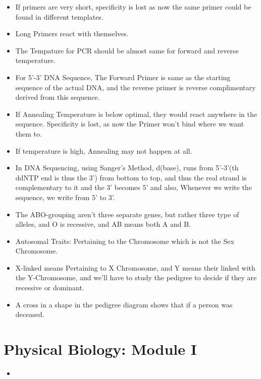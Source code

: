 \documentclass{article}
\begin{document}
\begin{itemize}
  \item If primers are very short, specificity is lost as now the same primer could be found in different templates.
  \item Long Primers react with themselves.
  \item The Tempature for PCR should be almost same for forward and reverse temperature.
  \item For 5'-3' DNA Sequence, The Forward Primer is same as the starting sequence of the actual DNA, and the reverse primer is reverse complimentary derived from this sequence.
  \item If Annealing Temperature is below optimal, they would react anywhere in the sequence. Specificity is lost, as now the Primer won't bind where we want them to.
  \item  If temperature is high, Annealing may not happen at all.
  \item In DNA Sequencing, using Sanger's Method, d(base), runs from 5'-3'(th ddNTP end is thus the 3') from bottom to top, and thus the real strand is complementary to it and the 3' becomes 5' and also, Whenever we write the sequence, we write from 5' to 3'.
  \item The ABO-grouping aren't three separate genes, but rather three type of alleles, and O is recessive, and AB means both A and B.
  \item Autosomal Traits: Pertaining to the Chromosome which is not the Sex Chromosome.
  \item X-linked means Pertaining to X Chromosome, and Y means their linked with the Y-Chromosome, and we'll have to study the pedigree to decide if they are recessive or dominant.
  \item A cross in a shape in the pedigree diagram shows that if a person was deceased.
\end{itemize}

\section{Physical Biology: Module I}

  \begin{itemize}
    \item 
  \end{itemize}
\end{document}
